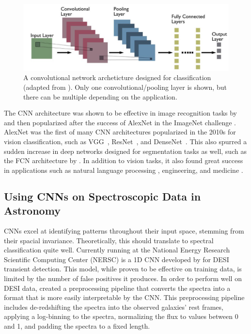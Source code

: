 \begin{figure}[t]
    \centering
    \includegraphics[width=.8\linewidth]{figures/Typical-CNN-architecture.png}
    \caption[Traditional CNN Architecture for Classification]{A convolutional network archeticture designed for classification (adapted from \cite{kumar2022_cnn}). Only
    one convolutional/pooling layer is shown, but there can be multiple depending on the application. }
    \label{fig:CNN}
\end{figure}


The CNN architecture was shown to be effective in image recognition tasks by
\textcite{lecun2004} and then popularized after the success of AlexNet in the 
ImageNet challenge \parencite{krizhevsky2012}. AlexNet was the first of many CNN 
architectures popularized in the 2010s for vision classification, such as VGG~\parencite{Simonyan15}, 
ResNet~\parencite{he2016deep}, and DenseNet~\parencite{Huang2016}. This also spurred a sudden increase in deep networks designed 
for segmentation tasks as well, such as the FCN architecture by \textcite{Shelhamer2016}. In addition to vision tasks, it also found 
great success in applications such as natural language processing \parencite{Kim2014}, engineering, and 
medicine \parencite{Kiranyaz2021}. 

\subsection{Using CNNs on Spectroscopic Data in Astronomy}
\label{sec:CNNspectra}
CNNs excel at identifying patterns throughout their input space, stemming from their spacial invariance. 
Theoretically, this should translate to spectral classification quite well. 
Currently running at the National Energy Research Scientific Computing Center (NERSC)
is a 1D CNN developed by \textcite{wasserman2021} for DESI transient detection.  This model, while
proven to be effective on training data, is limited by the number of false 
positives it produces. In order to perform well on DESI data, \textcite{wasserman2021} 
created a preprocessing pipeline that converts the spectra into a format 
that is more easily interpretable by the CNN. This preprocessing pipeline includes 
de-redshifting the spectra into the observed galaxies' rest frames, applying a 
log-binning to the spectra, normalizing the flux to values between 0 and 1, 
and padding the spectra to a fixed length. 


